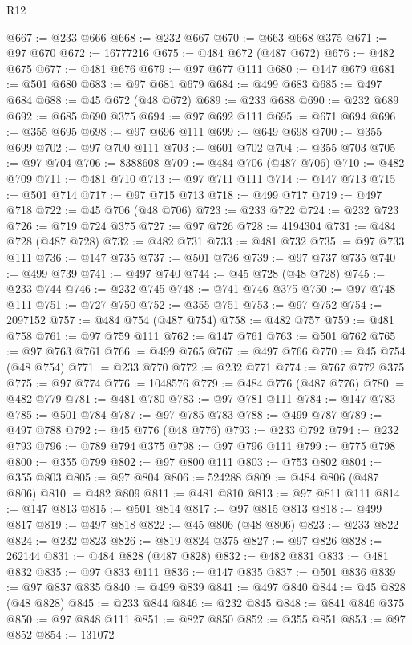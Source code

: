 \begin{lexlean}{R12}
\begin{coremodule}
{{{{{{{{{{{{{{{{{{{{{{{{{{{{{{{{{{{{{{{{{{{{{{{{{{{{{{{{{{{{{{{{{{{{{{{{{{{{{{{{{{@667 := @233 @666
@668 := @232 @667
@670 := @663 @668 @375
@671 := @97 @670
@672 := 16777216
@675 := @484 @672 (@487 @672)
@676 := @482 @675
@677 := @481 @676
@679 := @97 @677 @111
@680 := @147 @679
@681 := @501 @680
@683 := @97 @681 @679
@684 := @499 @683
@685 := @497 @684
@688 := @45 @672 (@48 @672)
@689 := @233 @688
@690 := @232 @689
@692 := @685 @690 @375
@694 := @97 @692 @111
@695 := @671 @694
@696 := @355 @695
@698 := @97 @696 @111
@699 := @649 @698
@700 := @355 @699
@702 := @97 @700 @111
@703 := @601 @702
@704 := @355 @703
@705 := @97 @704
@706 := 8388608
@709 := @484 @706 (@487 @706)
@710 := @482 @709
@711 := @481 @710
@713 := @97 @711 @111
@714 := @147 @713
@715 := @501 @714
@717 := @97 @715 @713
@718 := @499 @717
@719 := @497 @718
@722 := @45 @706 (@48 @706)
@723 := @233 @722
@724 := @232 @723
@726 := @719 @724 @375
@727 := @97 @726
@728 := 4194304
@731 := @484 @728 (@487 @728)
@732 := @482 @731
@733 := @481 @732
@735 := @97 @733 @111
@736 := @147 @735
@737 := @501 @736
@739 := @97 @737 @735
@740 := @499 @739
@741 := @497 @740
@744 := @45 @728 (@48 @728)
@745 := @233 @744
@746 := @232 @745
@748 := @741 @746 @375
@750 := @97 @748 @111
@751 := @727 @750
@752 := @355 @751
@753 := @97 @752
@754 := 2097152
@757 := @484 @754 (@487 @754)
@758 := @482 @757
@759 := @481 @758
@761 := @97 @759 @111
@762 := @147 @761
@763 := @501 @762
@765 := @97 @763 @761
@766 := @499 @765
@767 := @497 @766
@770 := @45 @754 (@48 @754)
@771 := @233 @770
@772 := @232 @771
@774 := @767 @772 @375
@775 := @97 @774
@776 := 1048576
@779 := @484 @776 (@487 @776)
@780 := @482 @779
@781 := @481 @780
@783 := @97 @781 @111
@784 := @147 @783
@785 := @501 @784
@787 := @97 @785 @783
@788 := @499 @787
@789 := @497 @788
@792 := @45 @776 (@48 @776)
@793 := @233 @792
@794 := @232 @793
@796 := @789 @794 @375
@798 := @97 @796 @111
@799 := @775 @798
@800 := @355 @799
@802 := @97 @800 @111
@803 := @753 @802
@804 := @355 @803
@805 := @97 @804
@806 := 524288
@809 := @484 @806 (@487 @806)
@810 := @482 @809
@811 := @481 @810
@813 := @97 @811 @111
@814 := @147 @813
@815 := @501 @814
@817 := @97 @815 @813
@818 := @499 @817
@819 := @497 @818
@822 := @45 @806 (@48 @806)
@823 := @233 @822
@824 := @232 @823
@826 := @819 @824 @375
@827 := @97 @826
@828 := 262144
@831 := @484 @828 (@487 @828)
@832 := @482 @831
@833 := @481 @832
@835 := @97 @833 @111
@836 := @147 @835
@837 := @501 @836
@839 := @97 @837 @835
@840 := @499 @839
@841 := @497 @840
@844 := @45 @828 (@48 @828)
@845 := @233 @844
@846 := @232 @845
@848 := @841 @846 @375
@850 := @97 @848 @111
@851 := @827 @850
@852 := @355 @851
@853 := @97 @852
@854 := 131072
}}}}}}}}}}}}}}}}}}}}}}}}}}}}}}}}}}}}}}}}}}}}}}}}}}}}}}}}}}}}}}}}}}}}}}}}}}}}}}}}}}
\end{coremodule}
\end{lexlean}
